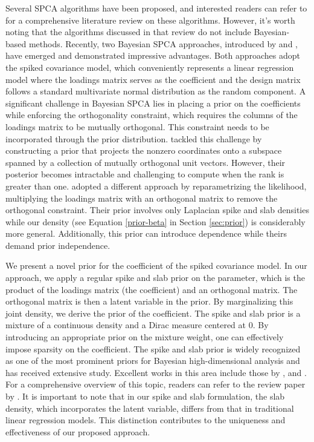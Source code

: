 \documentclass[pdftex, noinfoline, letter]{imsart}
\theoremstyle{plain}
\begin{document}
Several SPCA algorithms have been proposed, and interested readers can refer to \citet{zou18} for a comprehensive literature review on these algorithms. However, it's worth noting that the algorithms discussed in that review do not include Bayesian-based methods. Recently, two Bayesian SPCA approaches, introduced by \citet{gao15} and \citet{xie18}, have emerged and demonstrated impressive advantages. Both approaches adopt the spiked covariance model, which conveniently represents a linear regression model where the loadings matrix serves as the coefficient and the design matrix follows a standard multivariate normal distribution as the random component. A significant challenge in Bayesian SPCA lies in placing a prior on the coefficients while enforcing the orthogonality constraint, which requires the columns of the loadings matrix to be mutually orthogonal. This constraint needs to be incorporated through the prior distribution. \citet{gao15} tackled this challenge by constructing a prior that projects the nonzero coordinates onto a subspace spanned by a collection of mutually orthogonal unit vectors. However, their posterior becomes intractable and challenging to compute when the rank is greater than one.
\citet{xie18} adopted a different approach by reparametrizing the likelihood, multiplying the loadings matrix with an orthogonal matrix to remove the orthogonal constraint. Their prior involves only Laplacian spike and slab densities while our density (see Equation \eqref{prior-beta} in Section \ref{sec:prior}) is considerably more general. Additionally, this prior can introduce dependence while theirs demand prior independence. 

We present a novel prior for the coefficient of the spiked covariance model. In our approach, we apply a regular spike and slab prior on the parameter, which is the product of the loadings matrix (the coefficient) and an orthogonal matrix. The orthogonal matrix is then a latent variable in the prior. By marginalizing this joint density, we derive the prior of the coefficient. The spike and slab prior is a mixture of a continuous density and a Dirac measure centered at 0. By introducing an appropriate prior on the mixture weight, one can effectively impose sparsity on the coefficient. The spike and slab prior is widely recognized as one of the most prominent priors for Bayesian high-dimensional analysis and has received extensive study. Excellent works in this area include those by \citet{johnstone04, rockova18a,cast20a,cast12, cast15, martin17,  qiu2018multivariate, jammalamadaka2019predicting, qiu2020multivariate, jeong20, ohn23, ning23}, and \citet{ning20}. For a comprehensive overview of this topic, readers can refer to the review paper by \citet{banerjee20}.
It is important to note that in our spike and slab formulation, the slab density, which incorporates the latent variable, differs from that in traditional linear regression models. This distinction contributes to the uniqueness and effectiveness of our proposed approach.
\end{document}
